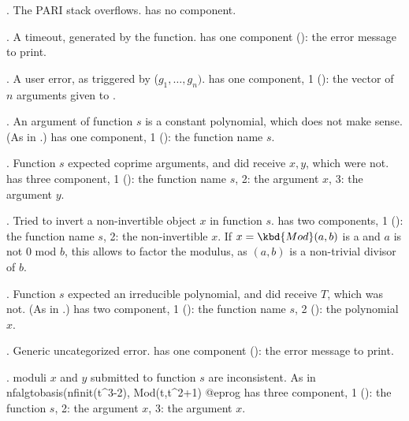  \item {}. The PARI stack overflows.
  has no component.


 \item {}. A timeout, generated by the  function.
  has one component (): the error message to print.

 \item {}. A user error, as triggered by
 ($g_1,\dots,g_n)$.
  has one component, 1 (): the vector of $n$ arguments given
 to .


 \item {}. An argument of function $s$ is a constant
 polynomial, which does not make sense. (As in .)
  has one component, 1 (): the function name $s$.

 \item {}. Function $s$ expected coprime arguments,
 and did receive $x,y$, which were not.
  has three component, 1 (): the function name $s$,
 2: the argument $x$, 3: the argument $y$.

 \item {}. Tried to invert a non-invertible object $x$ in
 function $s$.
  has two components, 1 (): the function name $s$,
 2: the non-invertible $x$. If $x = \kbd{Mod}(a,b)$
 is a  and $a$ is not $0$ mod $b$, this allows to factor
 the modulus, as $(a,b)$ is a non-trivial divisor of $b$.

 \item {}. Function $s$ expected an irreducible polynomial,
 and did receive $T$, which was not. (As in .)
  has two component, 1 (): the function name $s$,
 2 (): the polynomial $x$.

 \item {}. Generic uncategorized error.
  has one component (): the error message to print.

 \item {}. moduli $x$ and $y$ submitted to function $s$ are
 inconsistent. As in
 \bprog
   nfalgtobasis(nfinit(t^3-2), Mod(t,t^2+1)
 @eprog\noindent
  has three component, 1 (): the function $s$,
 2: the argument $x$, 3: the argument $x$.

